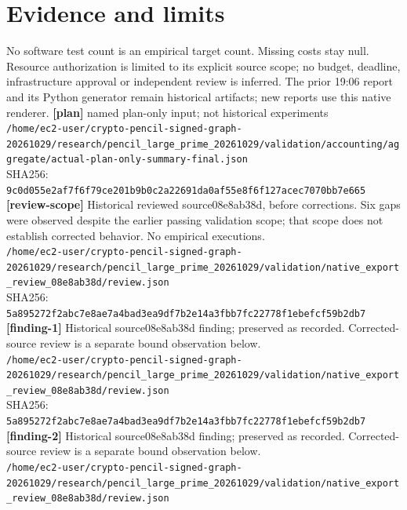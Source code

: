 \documentclass[11pt]{article}
\begin{document}
\section*{Evidence and limits}
No software test count is an empirical target count. Missing costs stay null. Resource authorization is limited to its explicit source scope; no budget, deadline, infrastructure approval or independent review is inferred. The prior 19:06 report and its Python generator remain historical artifacts; new reports use this native renderer.
\small
\textbf{[plan]} named plan-only input; not historical experiments\\
\texttt{/\allowbreak{}home/\allowbreak{}ec2-user/\allowbreak{}crypto-pencil-signed-graph-20261029/\allowbreak{}research/\allowbreak{}pencil\_large\_prime\_20261029/\allowbreak{}validation/\allowbreak{}accounting/\allowbreak{}aggregate/\allowbreak{}actual-plan-only-summary-final.json}\\
SHA256: \texttt{9c0d055e2af7f6f79ce201b9b0c2a22691da0af55e8f6f127acec7070bb7e665}\\
\textbf{[review-scope]} Historical reviewed source08e8ab38d, before corrections. Six gaps were observed despite the earlier passing validation scope; that scope does not establish corrected behavior. No empirical executions.\\
\texttt{/\allowbreak{}home/\allowbreak{}ec2-user/\allowbreak{}crypto-pencil-signed-graph-20261029/\allowbreak{}research/\allowbreak{}pencil\_large\_prime\_20261029/\allowbreak{}validation/\allowbreak{}native\_export\_review\_08e8ab38d/\allowbreak{}review.json}\\
SHA256: \texttt{5a895272f2abc7e8ae7a4bad3ea9df7b2e14a3fbb7fc22778f1ebefcf59b2db7}\\
\textbf{[finding-1]} Historical source08e8ab38d finding; preserved as recorded. Corrected-source review is a separate bound observation below.\\
\texttt{/\allowbreak{}home/\allowbreak{}ec2-user/\allowbreak{}crypto-pencil-signed-graph-20261029/\allowbreak{}research/\allowbreak{}pencil\_large\_prime\_20261029/\allowbreak{}validation/\allowbreak{}native\_export\_review\_08e8ab38d/\allowbreak{}review.json}\\
SHA256: \texttt{5a895272f2abc7e8ae7a4bad3ea9df7b2e14a3fbb7fc22778f1ebefcf59b2db7}\\
\textbf{[finding-2]} Historical source08e8ab38d finding; preserved as recorded. Corrected-source review is a separate bound observation below.\\
\texttt{/\allowbreak{}home/\allowbreak{}ec2-user/\allowbreak{}crypto-pencil-signed-graph-20261029/\allowbreak{}research/\allowbreak{}pencil\_large\_prime\_20261029/\allowbreak{}validation/\allowbreak{}native\_export\_review\_08e8ab38d/\allowbreak{}review.json}\\
\end{document}
